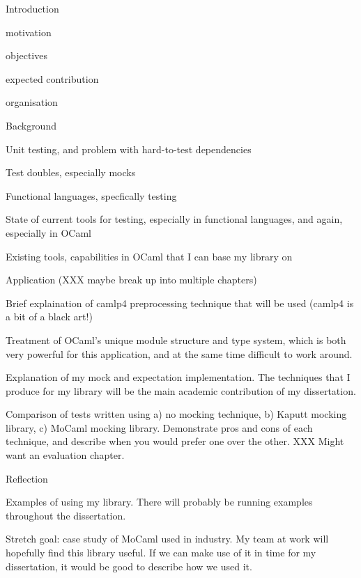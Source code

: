 \documentclass[proposal]{softeng}
\begin{document}
\begin{outline}
\item Introduction
  \begin{outline}
  \item motivation
  \item objectives
  \item expected contribution
  \item organisation
  \end{outline}
\item Background
  \begin{outline}
  \item Unit testing, and problem with hard-to-test dependencies
  \item Test doubles, especially mocks
  \item Functional languages, specfically testing
  \item State of current tools for testing, especially in
    functional languages, and again, especially in OCaml
  \item Existing tools, capabilities in OCaml that I can base my library on
  \end{outline}
\item Application (XXX maybe break up into multiple chapters)
  \begin{outline}
  \item Brief explaination of camlp4 preprocessing technique that
    will be used (camlp4 is a bit of a black art!)
  \item Treatment of OCaml's unique module structure and type
    system, which is both very powerful for this application, and at
    the same time difficult to work around.
  \item Explanation of my mock and expectation implementation. The
    techniques that I produce for my library will be the main
    academic contribution of my dissertation.
  \item Comparison of tests written using a) no mocking technique,
    b) Kaputt mocking library, c) MoCaml mocking
    library. Demonstrate pros and cons of each technique, and
    describe when you would prefer one over the other. XXX Might want an evaluation chapter.
  \end{outline}
\item Reflection
  \begin{outline}
  \item Examples of using my library. There will probably be running
    examples throughout the dissertation.
  \item Stretch goal: case study of MoCaml used in industry. My team
    at work will hopefully find this library useful. If we can make
    use of it in time for my dissertation, it would be good to
    describe how we used it.
  \end{outline}
\end{outline}

\nocite{*}


\end{document}
